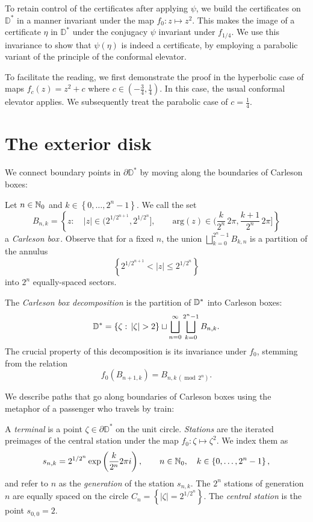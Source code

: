 To retain control of the certificates after applying $\psi$, we build the certificates on $\mathbb D^*$ in a manner invariant under the map $f_0: z\mapsto z^2$.
This makes the image of a certificate $\eta$ in $\mathbb D^{*}$ under the conjugacy $\psi$ invariant under $f_{1/4}$. We use this invariance to show that $\psi(\eta)$ is indeed a certificate, by employing a parabolic variant of the principle of the conformal elevator.

To facilitate the reading, we first demonstrate the proof in the hyperbolic case of maps $f_c(z)=z^2+c$ where  $c\in\left(-\frac {3}{4},\frac{1}{4}\right)$. In this case, the usual conformal elevator applies. We subsequently treat the parabolic case of $c=\frac{1}{4}$.

\section{The exterior disk}

We connect boundary points in $\partial \mathbb D^*$ by moving along the boundaries of Carleson boxes:
\begin{definition}
Let $n\in\mathbb{N}_{0}$ and $k\in\left\{ 0,\ldots,2^{n}-1\right\} $. We call the set
$$
B_{n,k}=\left\{ z:\quad\left|z\right|\in\biggl(2^{1/2^{n+1}}, 2^{1/2^{n}} \biggl],\qquad\mathrm{arg}(z)\in\biggl(\frac{k}{2^{n}} \, 2\pi,\frac{k+1}{2^{n}} \, 2\pi\biggl]\right\} 
$$
a \emph{Carleson box}\,.
Observe that for a fixed $n$, the union $\bigsqcup_{k=0}^{2^{n}-1}B_{k,n}$
is a partition of the annulus 
$$
\left\{ 2^{1/2^{n+1}} <\left|z\right|\leq 2^{1/2^{n}} \right\} 
$$
 into $2^{n}$ equally-spaced sectors.
 
The \emph{Carleson box decomposition} is the partition of $\mathbb{D}^{*}$ into Carleson
boxes:
$$
\D^{*}=\left\{ \zeta:\,\left|\zeta\right|>2\right\} \sqcup\bigsqcup_{n=0}^{\infty}\bigsqcup_{k=0}^{2^{n}-1}B_{n,k}.
$$
The crucial property of this decomposition is its invariance under $f_{0}$,
stemming from the relation
\begin{equation*}
f_{0}\left(B_{n+1,k}\right)=B_{n,k \,(\operatorname{mod} \,2^n)}.
\end{equation*}
\end{definition}

We describe paths that go along boundaries of Carleson boxes using the metaphor of a passenger who travels by train:

\begin{definition}
A \emph{terminal} is a point $\zeta \in \partial \mathbb D^*$ on the unit circle.
\emph{Stations
}are the iterated preimages of the central station under the map $f_{0}:\zeta\mapsto \zeta^{2}$.
We index them as 
$$
s_{n,k}=2^{1/2^{n}} \exp\left(\frac{k}{2^{n}}2\pi i\right),\qquad n\in\mathbb{N}_{0},\quad k\in\left\{ 0,\ldots,2^{n}-1\right\},
$$
and refer to $n$ as the \emph{generation} of the station $s_{n,k}$. The $2^{n}$ stations of generation $n$ are equally spaced on the circle $C_{n}=\left\{ \left|\zeta\right|=2^{1/2^{n}}\right\} $. 
The \emph{central station} is the point $s_{0,0}=2$. 
\end{definition}

